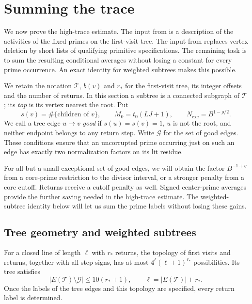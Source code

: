 \section{Summing the trace}\label{sec:trace-count}

We now prove the high-trace estimate.  The input from
 is a description of the activities of the fixed
primes on the first-visit tree.  The input from
 replaces vertex deletion by short lists of
qualifying primitive specifications.  The remaining task is to sum the
resulting conditional averages without losing a constant for every prime
occurrence.  An exact identity for weighted subtrees makes this possible.

We retain the notation $\mathscr T$, $b(v)$ and $r_*$ for the first-visit
tree, its integer offsets and the number of returns.  In this section a
subtree is a connected subgraph of $\mathscr T$; its \emph{top} is its
vertex nearest the root.  Put
\[
 s(v)=\#\{\text{children of }v\},\qquad
 M_0=t_0(LJ+1),\qquad N_{\mathrm{exc}}=B^{1-\rho/2}.
\]
We call a tree edge $u\longrightarrow v$ \emph{good} if
$s(u)=s(v)=1$, $u$ is not the root, and neither endpoint belongs to any
return step.  Write $\mathcal G$ for the set of good edges.  These
conditions ensure that an uncorrupted prime occurring just on such an
edge has exactly two normalization factors on its lit residue.

For all but a small exceptional set of good edges, we will obtain the
factor $B^{-1+\eta}$ from a core-prime restriction to the divisor interval,
or a stronger penalty from a core cutoff.  Returns receive a cutoff
penalty as well.  Signed center-prime averages provide the further saving
needed in the high-trace estimate.  The weighted-subtree identity below
will let us sum the prime labels without losing these gains.

\subsection{Tree geometry and weighted subtrees}

\begin{lemma}\label{lem:trace-topology}
For a closed line of length $\ell$ with $r_*$ returns, the topology of first
visits and returns, together with all step signs, has at most
$4^\ell(\ell+1)^{r_*}$ possibilities.  Its tree satisfies
\begin{equation}\label{eq:trace-bad-edges}
 |E(\mathscr T)\setminus\mathcal G|\le 10(r_*+1),\qquad
 \ell=|E(\mathscr T)|+r_*.
\end{equation}
Once the labels of the tree edges and this topology are specified, every
return label is determined.
\end{lemma}

